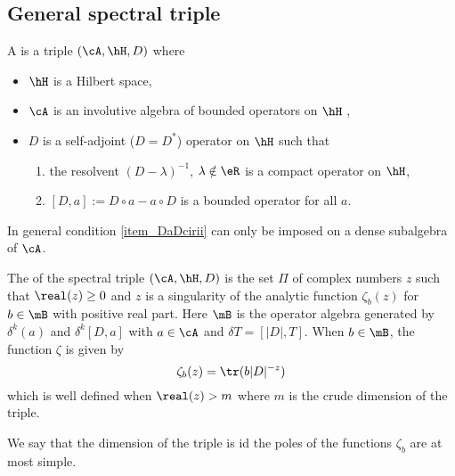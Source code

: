 \subsection{General spectral triple}
A  is a triple $(\cA,\hH,D)$ where
\begin{itemize}
\item $\hH$ is a Hilbert space,
\item $\cA$ is an involutive algebra of bounded operators on $\hH$ ,
\item $D$ is a self-adjoint ($D=D^*$) operator on $\hH$ such that
\begin{enumerate}
\item the resolvent $(D-\lambda)^{-1}$, $\lambda\notin\eR$ is a compact operator on $\hH$,
\item\label{item_DaDcirii} $[D,a]:=D\circ a-a\circ D$ is a bounded operator for all $a$.
\end{enumerate}
\end{itemize}
In general condition \ref{item_DaDcirii} can only be imposed on a dense subalgebra of $\cA$. 

\begin{definition}	\label{DefDimSpec}
The  of the spectral triple $(\cA,\hH,D)$ is the set $\Pi$ of complex numbers $z$ such that $\real(z)\geq 0$ and $z$ is a singularity of the analytic function $\zeta_b(z)$ for $b\in\mB$ with positive real part. Here $\mB$ is the operator algebra generated by $\delta^k(a)$ and $\delta^k[D,a]$ with $a\in \cA$ and $\delta T=[| D |,T]$. When $b\in\mB$, the function $\zeta$ is given by
\[ 
  \zeta_b(z)=\tr(b| D |^{-z})
\]
which is well defined when $\real(z)>m$ where $m$ is the crude dimension of the triple.
\end{definition}

We say that the dimension of the triple is  id the poles of the functions $\zeta_b$ are at most simple.

